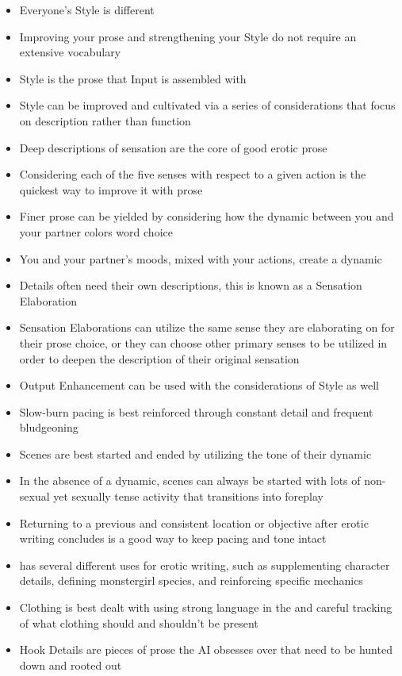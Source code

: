 \documentclass[Source-main.tex]{subfiles}
\begin{document}
\begin{itemize}
\item{Everyone's Style is different}
\item{Improving your prose and strengthening your Style do not require an extensive vocabulary}
\item{Style is the prose that Input is assembled with}
\item{Style can be improved and cultivated via a series of considerations that focus on description rather than function}
\item{Deep descriptions of sensation are the core of good erotic prose}
\item{Considering each of the five senses with respect to a given action is the quickest way to improve it with prose}
\item{Finer prose can be yielded by considering how the dynamic between you and your partner colors word choice}
\item{You and your partner's moods, mixed with your actions, create a dynamic}
\item{Details often need their own descriptions, this is known as a Sensation Elaboration}
\item{Sensation Elaborations can utilize the same sense they are elaborating on for their prose choice, or they can choose other primary senses to be utilized in order to deepen the description of their original sensation}
\item{Output Enhancement can be used with the considerations of Style as well}

\item{Slow-burn pacing is best reinforced through constant detail and frequent bludgeoning}
\item{Scenes are best started and ended by utilizing the tone of their dynamic}
\item{In the absence of a dynamic, scenes can always be started with lots of non-sexual yet sexually tense activity that transitions into foreplay}
\item{Returning to a previous and consistent location or objective after erotic writing concludes is a good way to keep pacing and tone intact}
\item{\wi has several different uses for erotic writing, such as supplementing character details, defining monstergirl species, and reinforcing specific mechanics}
\item{Clothing is best dealt with using strong language in the \rem and careful tracking of what clothing should and shouldn't be present}
\item{Hook Details are pieces of prose the AI obsesses over that need to be hunted down and rooted out}

\end{itemize}
\end{document}
